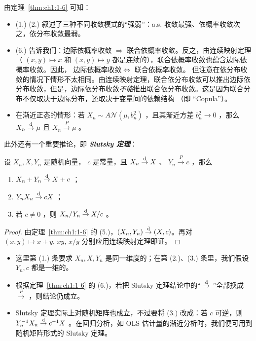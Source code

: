 由定理~\ref{thm:ch1:1-6} 可知：

\begin{itemize}
\tightlist
\item
  (1.) (2.) 叙述了三种不同收敛模式的``强弱''：a.s. 收敛最强、依概率收敛次之，依分布收敛最弱。
\item
  (6.) 告诉我们：边际依概率收敛 $\Rightarrow$ 联合依概率收敛。反之，由连续映射定理（ $(x,y)\mapsto x$ 和 $(x,y)\mapsto y$ 都是连续的），联合依概率收敛也蕴含边际依概率收敛。因此， 边际依概率收敛\textbf{$\Leftrightarrow$} 联合依概率收敛。
    但注意在依分布收敛的情况下情形不太相同。由连续映射定理，联合依分布收敛可以推出边际依分布收敛，但是，边际依分布收敛\emph{不能}推出联合依分布收敛。这是因为联合分布不仅取决于边际分布，还取决于变量间的依赖结构 （即 ``Copula''）。
\item 
  在渐近正态的情形：若 $X_n\sim A\mathcal N(\mu,b_n^2)$ ，且其渐近方差 $b_n^2\to 0$ ，那么 $X_n\overset{\rm d}\to \mu$ 且 $X_n\overset P\to \mu$ 。
\end{itemize}

此外还有一个重要推论，即 \textbf{\emph{Slutsky 定理}}：

\begin{corollary}[Slutsky 定理]\label{cor:ch1:slutsky}

\label{cor:ch1:1-7}设 $X_n,X,Y_n$ 是随机向量， $c$ 是常量，且 $X_n\overset{\rm d}\to X$ 、 $Y_n\overset P\to c$ ，那么

\begin{enumerate}
\def\labelenumi{\arabic{enumi}.}
\tightlist
\item
  $X_n+Y_n\overset{\rm d}\to X+c$ ；
\item
  $Y_nX_n\overset{\rm d}\to cX$ ；
\item
  若 $c\ne 0$ ，则 $X_n/Y_n\overset{\rm d}\to X/c$ 。
\end{enumerate}

\end{corollary}

\begin{proof}

由定理~\ref{thm:ch1:1-6} 的 (5.)，$(X_n, Y_n)\overset{\rm d}\to (X, c)$。再对 $(x,y)\mapsto x+y,\,xy,\,x/y$ 分别应用连续映射定理即证。

\end{proof}

\begin{remark}

\begin{itemize}
\tightlist
\item
  这里第 (1.) 条要求 $X_n,X,Y_n$ 是同一维度的；在第 (2.)、(3.) 条里，我们假设 $Y_n,c$ 都是一维的。
\item
  根据定理~\ref{thm:ch1:1-6} 的 (6.)，若把 Slutsky 定理结论中的`` $\overset{\rm d}\to$ ''全部换成 $\overset P\to$ ，则结论仍成立。
\item
  Slutsky 定理实际上对随机矩阵也成立，不过要将 (3.) 改成：若 $c$ 可逆，则 $Y_n^{-1}X_n\overset{\rm d}\to c^{-1}X$ 。在回归分析，如 OLS 估计量的渐近分析时，我们便可用到随机矩阵形式的 Slutsky 定理。
\end{itemize}
\end{remark}

